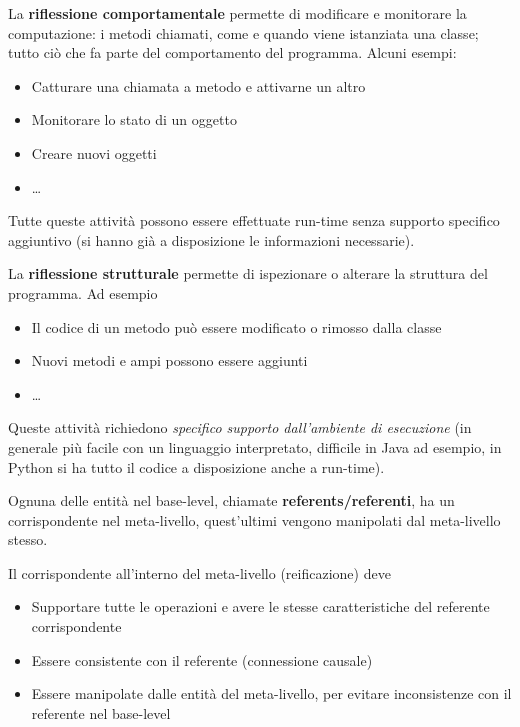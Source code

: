 La \textbf{riflessione comportamentale} permette di modificare e monitorare la computazione: i metodi chiamati, come e quando viene istanziata una classe; tutto ciò che fa parte del comportamento del programma. Alcuni esempi:
\begin{itemize}
	\item Catturare una chiamata a metodo e attivarne un altro
	
	\item Monitorare lo stato di un oggetto
	
	\item Creare nuovi oggetti
	
	\item  \dots
\end{itemize}

Tutte queste attività possono essere effettuate run-time senza supporto specifico aggiuntivo (si hanno già a disposizione le informazioni necessarie).

La \textbf{riflessione strutturale} permette di ispezionare o alterare la struttura del programma. Ad esempio
\begin{itemize}
	\item Il codice di un metodo può essere modificato o rimosso dalla classe
	
	\item Nuovi metodi e ampi possono essere aggiunti
	
	\item \dots
\end{itemize}

Queste attività richiedono \textit{specifico supporto dall'ambiente di esecuzione} (in generale più facile con un linguaggio interpretato, difficile in Java ad esempio, in Python si ha tutto il codice a disposizione anche a run-time).

Ognuna delle entità nel base-level, chiamate \textbf{referents/referenti}, ha un corrispondente nel meta-livello, quest'ultimi vengono manipolati dal meta-livello stesso. 

Il corrispondente all'interno del meta-livello (reificazione) deve
\begin{itemize}
	\item Supportare tutte le operazioni e avere le stesse caratteristiche del referente corrispondente
	
	\item Essere consistente con il referente (connessione causale)
	
	\item Essere manipolate dalle entità del meta-livello, per evitare inconsistenze con il referente nel base-level
\end{itemize}

